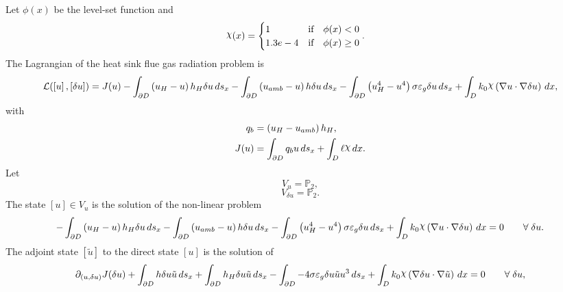 \documentclass[preview]{standalone}
\let\oldcdot\cdot
\let\cdot\oldcdot
\begin{document}
Let $\phi(x)$ be the level-set function and
 \begin{align*}\raisebox{\depth}{$\chi$}(x) &= \begin{cases} 1 & \mbox{if}\quad \phi(x) < 0 \\ 1.3e-4 & \mbox{if}\quad \phi(x)  \ge 0 \end{cases}.\end{align*}
The Lagrangian of the heat sink flue gas radiation problem is
\begin{dmath*}
\mathcal L(\left[ u\right],\left[ \delta u\right]) = J(u) -  \int_{\partial D} \left(u_{H} - u\right) h_{H} \delta u \,ds_x -  \int_{\partial D} \left(u_{amb} - u\right) h \delta u \,ds_x -  \int_{\partial D} \left(u_{H}^{4} - u^{4}\right) \sigma \varepsilon_{g} \delta u \,ds_x +  \int_{D} k_{0} \raisebox{\depth}{$\chi$} \left(  \nabla u  \cdot  \nabla \delta u  \right) \,dx , 
\end{dmath*}
with 
\begin{align*}
q_{b} &= \left(u_{H} - u_{amb}\right) h_{H},\\
J(u) &=  \int_{\partial D} q_{b} u \,ds_x +  \int_{D} \ell \raisebox{\depth}{$\chi$} \,dx.
 \end{align*}
Let
\begin{equation*}
V_{u} = \mathbb P_{2},\end{equation*}
\begin{equation*}
V_{\delta u} = \mathbb P_{2}.\end{equation*}
The state $\left[ u\right] \in  V_{u}$ is the solution of the non-linear problem
\begin{dmath*}
-  \int_{\partial D} \left(u_{H} - u\right) h_{H} \delta u \,ds_x -  \int_{\partial D} \left(u_{amb} - u\right) h \delta u \,ds_x -  \int_{\partial D} \left(u_{H}^{4} - u^{4}\right) \sigma \varepsilon_{g} \delta u \,ds_x +  \int_{D} k_{0} \raisebox{\depth}{$\chi$} \left(  \nabla u  \cdot  \nabla \delta u  \right) \,dx = 0\qquad \forall\; \delta u . 
\end{dmath*}
The adjoint state $\left[ \tilde u\right]$ to the direct state $\left[ u\right]$ is the solution of
\begin{dmath*}
\partial_{(u,\delta u)} J(\delta u) +  \int_{\partial D} h \delta u \tilde u \,ds_x +  \int_{\partial D} h_{H} \delta u \tilde u \,ds_x -  \int_{\partial D} - 4 \sigma \varepsilon_{g} \delta u \tilde u u^{3} \,ds_x +  \int_{D} k_{0} \raisebox{\depth}{$\chi$} \left(  \nabla \delta u  \cdot  \nabla \tilde u  \right) \,dx = 0\qquad \forall\; \delta u , 
\end{dmath*}
\end{document}
